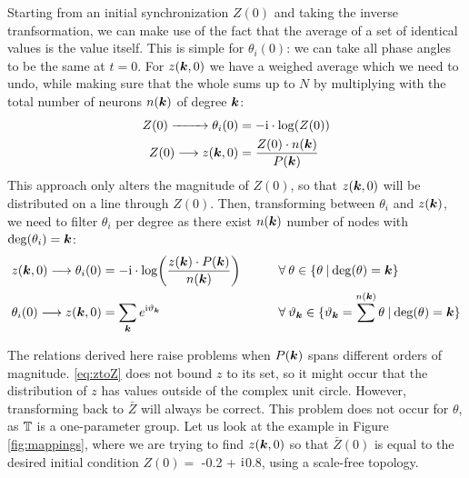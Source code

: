 Starting from an initial synchronization $Z(0)$ and taking the inverse tranfsormation, we can make use of the fact that the average of a set of identical values is the value itself. This is simple for $\theta_i(0)$: we can take all phase angles to be the same at $t = 0$. For $z({\boldsymbol{k}},0)$ we have a weighed average which we need to undo, while making sure that the whole sums up to $N$ by multiplying with the total number of neurons $n({\boldsymbol{k}})$ of degree ${\boldsymbol{k}}$:
\begin{align}
Z(0) \xrightarrow{\hspace*{8mm}} \theta_i(0) &= -\ic \cdot \log \left( Z(0) \right)  \label{eq:Ztotheta} \\
Z(0) \longrightarrow z(\k,0) &= \frac{Z(0) \cdot n(\k)}{P(\k)} \label{eq:Ztoz}
\end{align}
This approach only alters the magnitude of $Z(0)$, so that $z({\boldsymbol{k}},0)$ will be distributed on a line through $Z(0)$. Then, transforming between $\theta_i$ and $z({\boldsymbol{k}})$, we need to filter $\theta_i$ per degree as there exist $n({\boldsymbol{k}})$ number of nodes with ${\rm deg} ( \theta_i ) = {\boldsymbol{k}}$:
\begin{alignat}{2}
z(\k,0) \longrightarrow \theta_i(0) &= -\ic \cdot \log \left( \frac{z(\k)\cdot P(\k)}{n(\k)} \right) \qquad &&\forall \: \theta \in \{ \theta \: | \: \degree(\theta) = \k \}  \label{eq:ztottheta}\\
\theta_i(0) \longrightarrow z(\k,0) &= \sum_{\k} e^{\ic \vartheta_{\k}} \qquad \qquad &&\forall \: \vartheta_{\k} \in \{ \vartheta_{\k} = \sum^{n(\k)} \theta \: | \: \degree(\theta) = \k \} \label{eq:thetatoz}
\end{alignat}

The relations derived here raise problems when $P({\boldsymbol{k}})$ spans different orders of magnitude. \eqref{eq:ztoZ} does not bound $z$ to its set, so it might occur that the distribution of $z$ has values outside of the complex unit circle. However, transforming back to $\bar{Z}$ will always be correct. This problem does not occur for $\theta$, as ${\mathbb{T}}$ is a one-parameter group. Let us look at the example in Figure \ref{fig:mappings}, where we are trying to find $z({\boldsymbol{k}}, 0)$ so that $\bar{Z}(0)$ is equal to the desired initial condition $Z(0) = $ -0.2 + ${\rm{i}}$0.8, using a scale-free topology. \\

